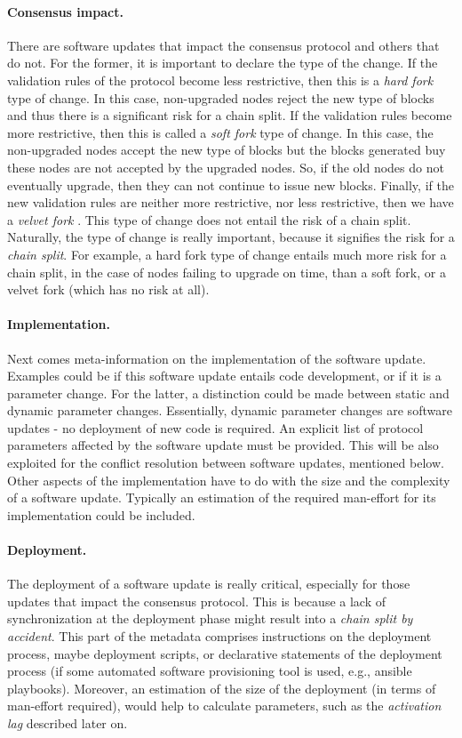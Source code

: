 \paragraph{Consensus impact.} There are software updates that impact the consensus protocol and others that do not. For the former, it is important to declare the type of the change. If the validation rules of the protocol become less restrictive, then this is a \emph{hard fork} type of change. In this case, non-upgraded nodes reject the new type of blocks and thus there is a significant risk for a chain split. If the validation rules become more restrictive, then this is called a \emph{soft fork} type of change. In this case, the non-upgraded nodes accept the new type of blocks but the blocks generated buy these nodes are not accepted by the upgraded nodes. So, if the old nodes do not eventually upgrade, then they can not continue to issue new blocks. Finally, if the new validation rules are neither more restrictive, nor less restrictive, then we have a \emph{velvet fork} \cite{velvet}. This type of change does not entail the risk of a chain split. Naturally, the type of change is really important, because it signifies the risk for a \emph{chain split}. For example, a hard fork type of change entails much more risk for a chain split, in the case of nodes failing to upgrade on time, than a soft fork, or a velvet fork (which has no risk at all).
\paragraph{Implementation.} Next comes meta-information on the implementation of the software update. Examples could be if this software update entails code development, or if it is a parameter change. For the latter, a distinction could be made between static and dynamic parameter changes. Essentially, dynamic parameter changes are  software updates - no deployment of new code is required. An explicit list of protocol parameters affected by the software update must be provided. This will be also exploited for the conflict resolution between software updates, mentioned below. Other aspects of the implementation have to do with the size and the complexity of a software update. Typically an estimation of the required man-effort for its implementation could be included.
\paragraph{Deployment.} The deployment of a software update is really critical, especially for those updates that impact the consensus protocol. This is because a lack of synchronization at the deployment phase might result into a \emph{chain split by accident}. This part of the metadata comprises instructions on the deployment process, maybe deployment scripts, or declarative statements of the deployment process (if some automated software provisioning tool is used, e.g., ansible playbooks). Moreover, an estimation of the size of the deployment (in terms of man-effort required), would help to calculate parameters, such as the \emph{activation lag} described later on.
